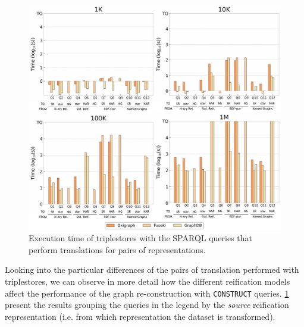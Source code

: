 
 


\begin{figure}[t!]
    \centering
    \includegraphics[width=\linewidth]{figures/chp6-1_results-queries.pdf}
    \caption[Execution times of KG re-construction in triplestores]{Execution time of triplestores with the SPARQL queries that perform translations for pairs of representations.}
    \label{fig:chp6-1_queries}
\end{figure}


Looking into the particular differences of the pairs of translation performed with triplestores, we can observe in more detail how the different reification models affect the performance of the graph re-construction with \texttt{CONSTRUCT} queries. \cref{fig:chp6-1_queries} present the results grouping the queries in the legend by the \textit{source} reification representation (i.e. from which representation the dataset is transformed). 

